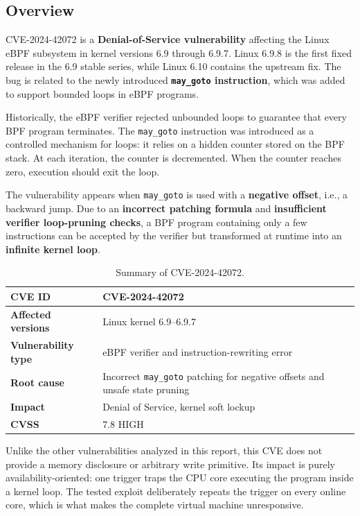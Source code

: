 \documentclass[../main.tex]{subfiles}
\begin{document}
\subsection{Overview}

CVE-2024-42072 is a \textbf{Denial-of-Service vulnerability} affecting the Linux eBPF subsystem in kernel versions 6.9 through 6.9.7. Linux 6.9.8 is the first fixed release in the 6.9 stable series, while Linux 6.10 contains the upstream fix. The bug is related to the newly introduced \textbf{\texttt{may\_goto} instruction}, which was added to support bounded loops in eBPF programs.

Historically, the eBPF verifier rejected unbounded loops to guarantee that every BPF program terminates. The \texttt{may\_goto} instruction was introduced as a controlled mechanism for loops: it relies on a hidden counter stored on the BPF stack. At each iteration, the counter is decremented. When the counter reaches zero, execution should exit the loop.

The vulnerability appears when \texttt{may\_goto} is used with a \textbf{negative offset}, i.e., a backward jump. Due to an \textbf{incorrect patching formula} and \textbf{insufficient verifier loop-pruning checks}, a BPF program containing only a few instructions can be accepted by the verifier but transformed at runtime into an \textbf{infinite kernel loop}.

\begin{table}[H]
\centering
\begin{tabularx}{\textwidth}{|l|X|}
\hline
\textbf{CVE ID} & CVE-2024-42072 \\
\hline
\textbf{Affected versions} & Linux kernel 6.9--6.9.7 \\
\hline
\textbf{Vulnerability type} & eBPF verifier and instruction-rewriting error \\
\hline
\textbf{Root cause} & Incorrect \texttt{may\_goto} patching for negative offsets and unsafe state pruning \\
\hline
\textbf{Impact} & Denial of Service, kernel soft lockup \\
\hline
\textbf{CVSS} & 7.8 HIGH \\
\hline
\end{tabularx}
\caption{Summary of CVE-2024-42072.}
\end{table}

Unlike the other vulnerabilities analyzed in this report, this CVE does not provide a memory disclosure or arbitrary write primitive. Its impact is purely availability-oriented: one trigger traps the CPU core executing the program inside a kernel loop. The tested exploit deliberately repeats the trigger on every online core, which is what makes the complete virtual machine unresponsive.
\end{document}
